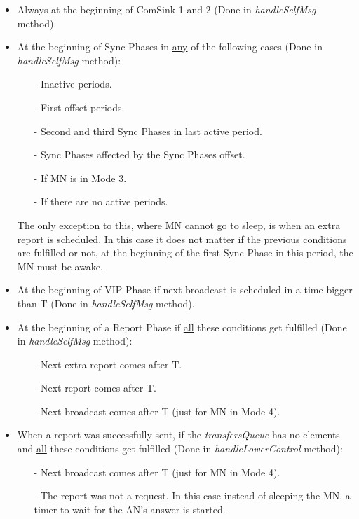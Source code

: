 \begin{itemize}
 \item Always at the beginning of ComSink 1 and 2 (Done in \textit{handleSelfMsg} method).
 
 \item At the beginning of Sync Phases in \underline{any} of the following cases (Done in \textit{handleSelfMsg} method):
    \begin{itemize}
      \item[-] Inactive periods.
      \item[-] First offset periods.
      \item[-] Second and third Sync Phases in last active period.
      \item[-] Sync Phases affected by the Sync Phases offset.
      \item[-] If \ac{MN} is in Mode 3.
      \item[-] If there are no active periods.
    \end{itemize}
  The only exception to this, where \ac{MN} cannot go to sleep, is when an extra report is scheduled. In this case it does not matter if the 
  previous conditions are fulfilled or not, at the beginning of the first Sync Phase in this period, the \ac{MN} must be awake.

 \item At the beginning of \ac{VIP} Phase if next broadcast is scheduled in a time bigger than T (Done in \textit{handleSelfMsg} method).

 \item At the beginning of a Report Phase if \underline{all} these conditions get fulfilled (Done in \textit{handleSelfMsg} method):
    \begin{itemize}
      \item[-] Next extra report comes after T.
      \item[-] Next report comes after T.
      \item[-] Next broadcast comes after T (just for \ac{MN} in Mode 4).
    \end{itemize}

  \item When a report was successfully sent, if the \textit{transfersQueue} has no elements and \underline{all} these conditions get fulfilled 
  (Done in \textit{handleLowerControl} method):
    \begin{itemize}
      \item[-] Next broadcast comes after T (just for \ac{MN} in Mode 4).
      \item[-] The report was not a request. In this case instead of sleeping the \ac{MN}, a timer to wait for the \ac{AN}'s answer is started.
    \end{itemize}


\end{itemize}
